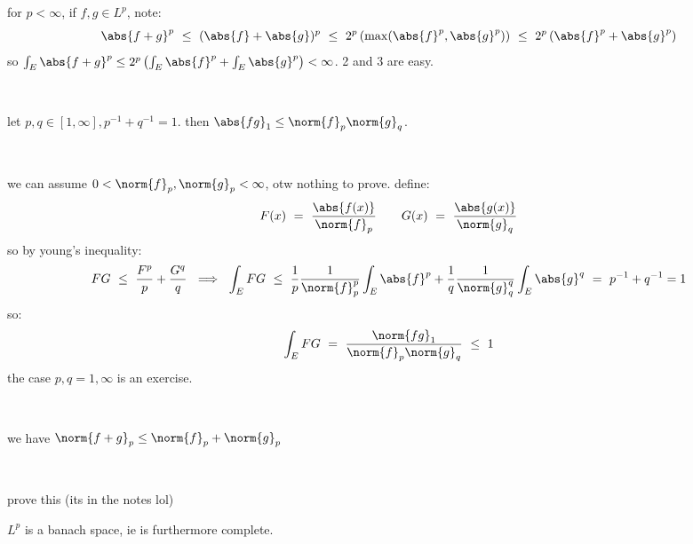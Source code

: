 \begin{pf}
	for $p<\infty$, if $f,g\in L^{p}$, note:
	\begin{equation*}
		\abs{f+g}^{p}
		\ \leq \ (\abs{f}+\abs{g})^{p}
		\ \leq \ 2^{p}\left(\max(\abs{f}^{p},\abs{g}^{p})\right)
		\ \leq \ 2^{p}\left(\abs{f}^{p}+\abs{g}^{p}\right)
	\end{equation*}
	so $\int_{E}\abs{f+g}^{p}\leq2^{p}\left(\int_{E}\abs{f}^{p}+\int_{E}\abs{g}^{p}\right)<\infty$.
	2 and 3 are easy.
\end{pf} \

\begin{thm}[title=Holder's Inequality]
	let $p,q\in[1,\infty],p^{-1}+q^{-1}=1$.
	then $\abs{fg}_{1}\leq\norm{f}_{p}\norm{g}_{q}$.
\end{thm} \

\begin{pf}
	we can assume $0<\norm{f}_{p},\norm{g}_{p}<\infty$, otw nothing to prove.
	define:
	\begin{equation*}
		F(x) \ = \ \frac{\abs{f(x)}}{\norm{f}_{p}} \qquad
		G(x) \ = \ \frac{\abs{g(x)}}{\norm{g}_{q}}
	\end{equation*}
	so by young's inequality:
	\begin{equation*}
		FG \ \leq \ \frac{F^{p}}{p}+\frac{G^{q}}{q}
		\ \implies \ \int_{E}FG \ \leq \
		\frac{1}{p}\frac{1}{\norm{f}_{p}^{p}}\int_{E}\abs{f}^{p}
		+ \frac{1}{q}\frac{1}{\norm{g}_{q}^{q}}\int_{E}\abs{g}^{q}
		\ = \ p^{-1}+q^{-1}=1
	\end{equation*}
	so:
	\begin{equation*}
		\int_{E}FG \ = \ \frac{\norm{fg}_{1}}{\norm{f}_{p}\norm{g}_{q}} \ \leq \ 1
	\end{equation*}
	the case $p,q=1,\infty$ is an exercise.
\end{pf} \

\begin{thm}[title=Minkowski's Inequality]
	we have $\norm{f+g}_{p}\leq\norm{f}_{p}+\norm{g}_{p}$
\end{thm} \

\begin{exr}
	prove this (its in the notes lol)
\end{exr}

\begin{thm}
	$L^{p}$ is a banach space, ie is furthermore complete.
\end{thm} \

